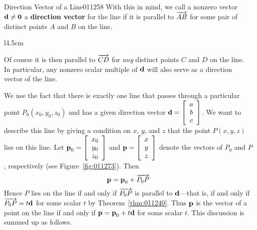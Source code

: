 \begin{definition}{Direction Vector of a Line}{011258}
With this in mind, we call a nonzero vector $\textbf{d} \neq \textbf{0}$ a \textbf{direction vector} for the line if it is parallel to $\overrightarrow{AB}$ for some pair of distinct points $A$ and $B$ on the line.
\end{definition}

\begin{wrapfigure}[7]{l}{4.5cm} 
	\centering
	
	\caption{\label{fig:011273}}
\end{wrapfigure}

\noindent Of course it is then parallel to $\overrightarrow{CD}$ for \textit{any} distinct points $C$ and $D$ on the line. In particular, any nonzero scalar multiple of $\textbf{d}$ will also serve as a direction vector of the line.


We use the fact that there is exactly one line that passes through a particular point $P_{0}(x_{0}, y_{0}, z_{0})$ and has a given direction vector 
$\textbf{d} = \left[
\begin{array}{c}
a \\
b \\
c  
\end{array}
\right]$. We want to describe this line by giving a condition on $x$, $y$, and $z$ that the point $P(x, y, z)$ lies on this line. Let 
$\textbf{p}_{0} = \left[
\begin{array}{c}
x_{0} \\
y_{0} \\
z_{0}  
\end{array}
\right]$ 
and 
$\textbf{p} = \left[
\begin{array}{c}
x \\
y \\
z  
\end{array}
\right]$ denote the vectors of $P_{0}$ and $P$, respectively (see Figure~\ref{fig:011273}). Then
\begin{equation*}
\textbf{p} = \textbf{p}_{0} + \overrightarrow{P_{0}P}
\end{equation*}
Hence $P$ lies on the line if and only if $\overrightarrow{P_{0}P}$ is parallel to $\textbf{d}$---that is, if and only if $\overrightarrow{P_{0}P} = t\textbf{d}$ for some scalar $t$ by Theorem~\ref{thm:011240}. Thus $\textbf{p}$ is the vector of a point on the line if and only if $\textbf{p} = \textbf{p}_{0} + t\textbf{d}$ for some scalar $t$. This discussion is summed up as follows.


